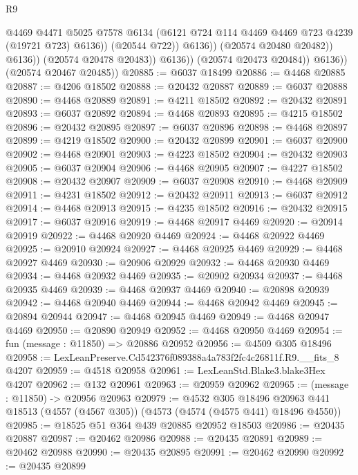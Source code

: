 \begin{lexlean}{R9}
\begin{coremodule}
                                @4469
                                @4471
                                @5025
                                @7578
                                @6134
                                (@6121 @724 @114 @4469 @4469 @723 @4239 (@19721 @723) @6136))
                              (@20544 @722))
                            @6136))
                        (@20574 @20480 @20482))
                      @6136))
                  (@20574 @20478 @20483))
                @6136))
            (@20574 @20473 @20484))
          @6136))
      (@20574 @20467 @20485))
@20885 := @6037 @18499
@20886 := @4468 @20885
@20887 := @4206 @18502
@20888 := @20432 @20887
@20889 := @6037 @20888
@20890 := @4468 @20889
@20891 := @4211 @18502
@20892 := @20432 @20891
@20893 := @6037 @20892
@20894 := @4468 @20893
@20895 := @4215 @18502
@20896 := @20432 @20895
@20897 := @6037 @20896
@20898 := @4468 @20897
@20899 := @4219 @18502
@20900 := @20432 @20899
@20901 := @6037 @20900
@20902 := @4468 @20901
@20903 := @4223 @18502
@20904 := @20432 @20903
@20905 := @6037 @20904
@20906 := @4468 @20905
@20907 := @4227 @18502
@20908 := @20432 @20907
@20909 := @6037 @20908
@20910 := @4468 @20909
@20911 := @4231 @18502
@20912 := @20432 @20911
@20913 := @6037 @20912
@20914 := @4468 @20913
@20915 := @4235 @18502
@20916 := @20432 @20915
@20917 := @6037 @20916
@20919 := @4468 @20917 @4469
@20920 := @20914 @20919
@20922 := @4468 @20920 @4469
@20924 := @4468 @20922 @4469
@20925 := @20910 @20924
@20927 := @4468 @20925 @4469
@20929 := @4468 @20927 @4469
@20930 := @20906 @20929
@20932 := @4468 @20930 @4469
@20934 := @4468 @20932 @4469
@20935 := @20902 @20934
@20937 := @4468 @20935 @4469
@20939 := @4468 @20937 @4469
@20940 := @20898 @20939
@20942 := @4468 @20940 @4469
@20944 := @4468 @20942 @4469
@20945 := @20894 @20944
@20947 := @4468 @20945 @4469
@20949 := @4468 @20947 @4469
@20950 := @20890 @20949
@20952 := @4468 @20950 @4469
@20954 := fun (message : @11850) => @20886 @20952
@20956 := @4509 @305 @18496
@20958 := LexLeanPreserve.Cd542376f089388a4a783f2fc4c26811f.R9.__fits_8 @4207
@20959 := @4518 @20958
@20961 := LexLeanStd.Blake3.blake3Hex @4207
@20962 := @132 @20961
@20963 := @20959 @20962
@20965 := (message : @11850) -> @20956 @20963
@20979 := @4532
    @305
    @18496
    @20963
    @441
    @18513
    (@4557 (@4567 @305))
    (@4573 (@4574 (@4575 @441) @18496 @4550))
@20985 := @18525 @51 @364 @439 @20885 @20952 @18503
@20986 := @20435 @20887
@20987 := @20462 @20986
@20988 := @20435 @20891
@20989 := @20462 @20988
@20990 := @20435 @20895
@20991 := @20462 @20990
@20992 := @20435 @20899

\end{coremodule}
\end{lexlean}
